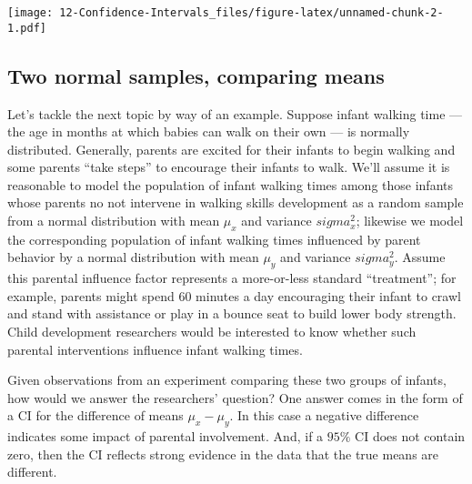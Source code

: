 \documentclass[
]{book}
\begin{document}
\texttt{[image: 12-Confidence-Intervals\_files/figure-latex/unnamed-chunk-2-1.pdf]}

\hypertarget{two-normal-samples-comparing-means}{%
\subsection{Two normal samples, comparing means}\label{two-normal-samples-comparing-means}}

Let's tackle the next topic by way of an example. Suppose infant walking time --- the age in months at which babies can walk on their own --- is normally distributed. Generally, parents are excited for their infants to begin walking and some parents ``take steps'' to encourage their infants to walk. We'll assume it is reasonable to model the population of infant walking times among those infants whose parents no not intervene in walking skills development as a random sample from a normal distribution with mean \(\mu_x\) and variance \(sigma_x^2\); likewise we model the corresponding population of infant walking times influenced by parent behavior by a normal distribution with mean \(\mu_y\) and variance \(sigma_y^2\). Assume this parental influence factor represents a more-or-less standard ``treatment''; for example, parents might spend 60 minutes a day encouraging their infant to crawl and stand with assistance or play in a bounce seat to build lower body strength. Child development researchers would be interested to know whether such parental interventions influence infant walking times.

Given observations from an experiment comparing these two groups of infants, how would we answer the researchers' question? One answer comes in the form of a CI for the difference of means \(\mu_x - \mu_y\). In this case a negative difference indicates some impact of parental involvement. And, if a \(95\%\) CI does not contain zero, then the CI reflects strong evidence in the data that the true means are different.
\end{document}
